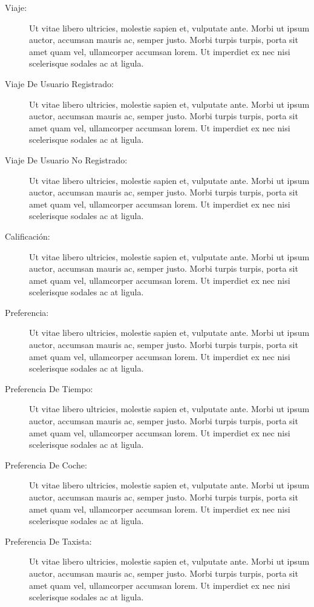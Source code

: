 \documentclass[a4paper, 10pt, twoside]{article}
\begin{document}
\begin{description}
  \item[Viaje:] Ut vitae libero ultricies, molestie sapien et, vulputate ante. Morbi ut ipsum auctor, accumsan mauris ac, semper justo. Morbi turpis turpis, porta sit amet quam vel, ullamcorper accumsan lorem. Ut imperdiet ex nec nisi scelerisque sodales ac at ligula.

  \item[Viaje De Usuario Registrado:] Ut vitae libero ultricies, molestie sapien et, vulputate ante. Morbi ut ipsum auctor, accumsan mauris ac, semper justo. Morbi turpis turpis, porta sit amet quam vel, ullamcorper accumsan lorem. Ut imperdiet ex nec nisi scelerisque sodales ac at ligula.

  \item[Viaje De Usuario No Registrado:] Ut vitae libero ultricies, molestie sapien et, vulputate ante. Morbi ut ipsum auctor, accumsan mauris ac, semper justo. Morbi turpis turpis, porta sit amet quam vel, ullamcorper accumsan lorem. Ut imperdiet ex nec nisi scelerisque sodales ac at ligula.

  \item[Calificación:] Ut vitae libero ultricies, molestie sapien et, vulputate ante. Morbi ut ipsum auctor, accumsan mauris ac, semper justo. Morbi turpis turpis, porta sit amet quam vel, ullamcorper accumsan lorem. Ut imperdiet ex nec nisi scelerisque sodales ac at ligula.

  \item[Preferencia:] Ut vitae libero ultricies, molestie sapien et, vulputate ante. Morbi ut ipsum auctor, accumsan mauris ac, semper justo. Morbi turpis turpis, porta sit amet quam vel, ullamcorper accumsan lorem. Ut imperdiet ex nec nisi scelerisque sodales ac at ligula.

  \item[Preferencia De Tiempo:] Ut vitae libero ultricies, molestie sapien et, vulputate ante. Morbi ut ipsum auctor, accumsan mauris ac, semper justo. Morbi turpis turpis, porta sit amet quam vel, ullamcorper accumsan lorem. Ut imperdiet ex nec nisi scelerisque sodales ac at ligula.

  \item[Preferencia De Coche:] Ut vitae libero ultricies, molestie sapien et, vulputate ante. Morbi ut ipsum auctor, accumsan mauris ac, semper justo. Morbi turpis turpis, porta sit amet quam vel, ullamcorper accumsan lorem. Ut imperdiet ex nec nisi scelerisque sodales ac at ligula.

  \item[Preferencia De Taxista:] Ut vitae libero ultricies, molestie sapien et, vulputate ante. Morbi ut ipsum auctor, accumsan mauris ac, semper justo. Morbi turpis turpis, porta sit amet quam vel, ullamcorper accumsan lorem. Ut imperdiet ex nec nisi scelerisque sodales ac at ligula.


\end{description}
\end{document}

